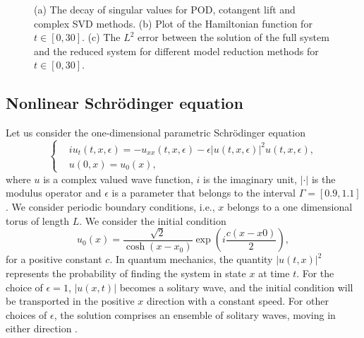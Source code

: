 \begin{figure}
\begin{minipage}{.5\linewidth}
\end{minipage}\par\medskip
\centering
{}

\caption{(a) The decay of singular values for POD, cotangent lift and complex SVD methods. (b) Plot of the Hamiltonian function for $t \in [0,30]$. (c) The $L^2$ error between the solution of the full system and the reduced system for different model reduction methods for $t \in [0,30]$.}
\label{fig:NuRe:2}
\end{figure}


\subsection{Nonlinear Schr\"odinger equation} Let us consider the one-dimensional parametric Schr\"odinger equation
\begin{equation} \label{eq:NuRe:10}
\left\{
\begin{aligned}
	& i u_t(t,x,\epsilon) = - u_{xx}(t,x,\epsilon) - \epsilon |u(t,x,\epsilon)|^2 u(t,x,\epsilon),\\
	& u(0,x) = u_0(x),
\end{aligned}
\right.
\end{equation}
where $u$ is a complex valued wave function, $i$ is the imaginary unit, $|\cdot|$ is the modulus operator and $\epsilon$ is a parameter that belongs to the interval $\Gamma = [0.9,1.1]$. We consider periodic boundary conditions, i.e., $x$ belongs to a one dimensional torus of length $L$. We consider the initial condition
\begin{equation} \label{eq:NuRe:11}
	u_0(x) = \frac{\sqrt 2}{\cosh(x - x_0)} \exp(i\frac{c(x-x0)}{2}),
\end{equation}
for a positive constant $c$. In quantum mechanics, the quantity $|u(t,x)|^2$ represents the probability of finding the system in state $x$ at time $t$. For the choice of $\epsilon = 1$, $|u(x,t)|$ becomes a solitary wave, and the initial condition will be transported in the positive $x$ direction with a constant speed. For other choices of $\epsilon$, the solution comprises an ensemble of solitary waves, moving in either direction \cite{Faou:2012vh}. 

